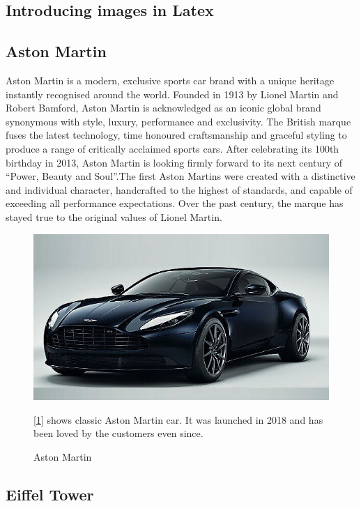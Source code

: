 \documentclass[12pt]{article}
\begin{document}
\begin{large}
\section{Introducing images in Latex}
\subsection{Aston Martin}
Aston Martin is a modern, exclusive sports car brand with a unique heritage instantly recognised around the world. Founded in 1913 by Lionel Martin and Robert Bamford, Aston Martin is acknowledged as an iconic global brand synonymous with style, luxury, performance and exclusivity. The British marque fuses the latest technology, time honoured craftsmanship and graceful styling to produce a range of critically acclaimed sports cars. After celebrating its 100th birthday in 2013, Aston Martin is looking firmly forward to its next century of “Power, Beauty and Soul”.The first Aston Martins were created with a distinctive and individual character, handcrafted to the highest of standards, and capable of exceeding all performance expectations. Over the past century, the marque has stayed true to the original values of Lionel Martin.

\begin{figure}[h]
\centering
\includegraphics[scale=0.5]{AstonMartin.jpg}
\caption{Aston Martin}
\label{fig : Aston Martin}
[\ref{fig : Aston Martin}] shows classic Aston Martin car. It was launched in 2018 and has been loved by the customers even since.\\
\end{figure}
\clearpage
\subsection{Eiffel Tower}


\end{large}
\end{document}
